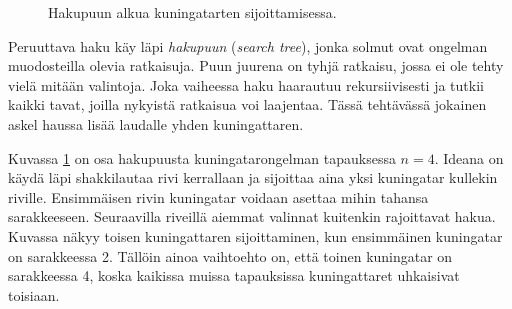 \begin{figure}
\center
{}
\caption{Hakupuun alkua kuningatarten sijoittamisessa.}
\label{fig:hakupuu}
\end{figure}

Peruuttava haku käy läpi \emph{hakupuun} (\emph{search tree}),
jonka solmut ovat ongelman muodosteilla olevia ratkaisuja.
Puun juurena on tyhjä ratkaisu, jossa ei ole tehty vielä mitään valintoja.
Joka vaiheessa haku haarautuu rekursiivisesti ja tutkii kaikki tavat,
joilla nykyistä ratkaisua voi laajentaa.
Tässä tehtävässä jokainen askel haussa lisää laudalle
yhden kuningattaren.

Kuvassa \ref{fig:hakupuu} on osa hakupuusta kuningatarongelman
tapauksessa $n=4$.
Ideana on käydä läpi shakkilautaa rivi kerrallaan ja sijoittaa aina
yksi kuningatar kullekin riville.
Ensimmäisen rivin kuningatar voidaan asettaa mihin tahansa sarakkeeseen.
Seuraavilla riveillä aiemmat valinnat kuitenkin rajoittavat hakua.
Kuvassa näkyy toisen kuningattaren sijoittaminen,
kun ensimmäinen kuningatar on sarakkeessa 2.
Tällöin ainoa vaihtoehto on, että toinen kuningatar on sarakkeessa 4,
koska kaikissa muissa tapauksissa kuningattaret uhkaisivat toisiaan.

